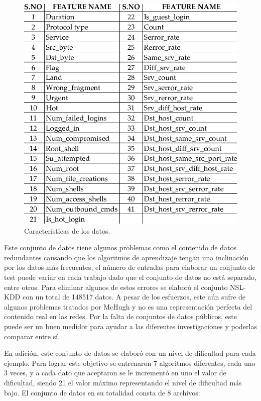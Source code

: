 \begin{figure}[hb]
    \centering
    \includegraphics[width=.6\linewidth]{Images/features.png}
    \caption{Características de los datos.}
    \label{fig:features}
\end{figure}

Este conjunto de datos tiene algunos problemas como el contenido de datos redundantes causando que los algoritmos de aprendizaje tengan una inclinación por los datos más frecuentes, el número de entradas para elaborar un conjunto de test puede variar en cada trabajo dado que el conjunto de datos no está separado, entre otros. Para eliminar algunos de estos errores se elaboró el conjunto NSL-KDD con un total de 148517  datos. A pesar de los esfuerzos, este aún sufre de algunos problemas tratados por McHugh \cite{mchugh2000testing} y no es una representación perfecta del contenido real en las redes. Por la falta de conjuntos de datos públicos, este puede ser un buen medidor para ayudar a las diferentes investigaciones y poderlas comparar entre sí. 

En adición, este conjunto de datos se elaboró con un nivel de dificultad para cada ejemplo. Para lograr este objetivo se entrenaron 7 algoritmos diferentes, cada uno 3 veces, y a cada dato que aceptaron se le incrementó en uno el valor de dificultad, siendo 21 el valor máximo representando el nivel de dificultad más bajo. El conjunto de datos en su totalidad consta de 8 archivos:

